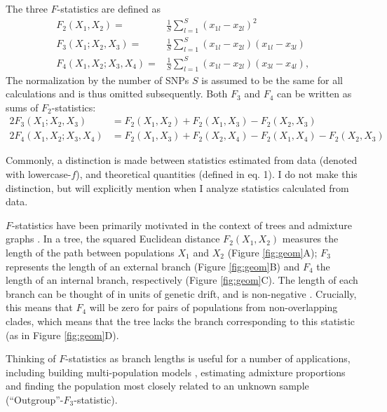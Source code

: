 \documentclass[12pt,fullpage, a4paper]{article}
\begin{document}
The three $F$-statistics are defined as
\begin{subequations}
	\begin{align}
	F_2(X_1, X_2) =& \frac{1}{S}\sum_{l=1}^S(x_{1l} - x_{2l})^2
	\\
	F_3(X_1; X_2, X_3) =& \frac{1}{S}\sum_{l=1}^S(x_{1l} - x_{2l})(x_{1l} - x_{3l}) \\	
	F_4(X_1, X_2; X_3, X_4) =& \frac{1}{S}\sum_{l=1}^S(x_{1l} - x_{2l})(x_{3l} - x_{4l}) 	\text{,}
	\end{align}
\end{subequations}
The normalization by the number of SNPs $S$ is assumed to be the same for all calculations and is thus omitted subsequently. Both $F_3$ and $F_4$ can be written as sums of $F_2$-statistics:
\begin{subequations}
	\begin{align}
	2F_3(X_1; X_2, X_3) &=  F_2(X_1, X_2) + F_2(X_1, X_3) - F_2(X_2, X_3)\label{eq:f3fromf2}\\
	2F_4(X_1, X_2; X_3, X_4) &= F_2(X_1, X_3) + F_2(X_2, X_4) - F_2(X_1,X_4) - F_2(X_2, X_3)\label{eq:f4fromf2}
	\end{align}
\end{subequations}

Commonly, a distinction is made between statistics estimated from data (denoted with lowercase-$f$), and theoretical quantities (defined in eq. 1). I do not make this distinction, but will explicitly mention when I analyze statistics calculated from data.
 
$F$-statistics have been primarily motivated in the context of trees and admixture graphs \citep{patterson2012}. In a tree, the squared Euclidean distance $F_2(X_1, X_2)$ measures the length of the path between populations $X_1$ and $X_2$ (Figure \ref{fig:geom}A); $F_3$ represents the length of an external branch (Figure \ref{fig:geom}B) and $F_4$ the length of an internal branch, respectively (Figure \ref{fig:geom}C). The length of each branch can be thought of in units of genetic drift, and is non-negative \citep{patterson2012}. Crucially, this means that $F_4$ will be zero for pairs of populations from non-overlapping clades, which means that the tree lacks the branch corresponding to this statistic (as in Figure \ref{fig:geom}D).
 
Thinking of $F$-statistics as branch lengths is useful for a number of applications, including building multi-population models \citep{patterson2012, lipson2013}, estimating admixture proportions \citep{petr2019, harney2021} and finding the population most closely related to an unknown sample (``Outgroup''-$F_3$-statistic).
\end{document}
